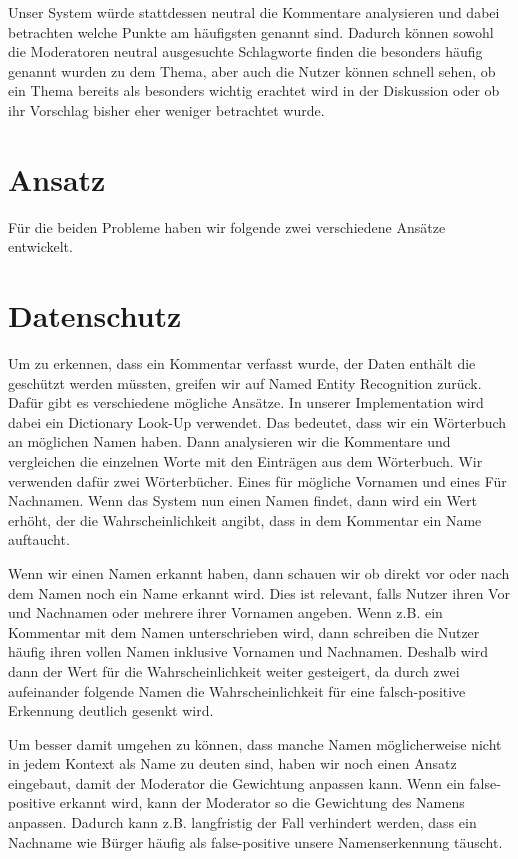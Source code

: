 \documentclass[runningheads]{llncs}
\begin{document}
Unser System würde stattdessen neutral die Kommentare analysieren und dabei betrachten welche Punkte am häufigsten genannt sind.
Dadurch können sowohl die Moderatoren neutral ausgesuchte Schlagworte finden die besonders häufig genannt wurden zu dem Thema, aber auch die Nutzer können schnell sehen, ob ein Thema bereits als besonders wichtig erachtet wird in der Diskussion oder ob ihr Vorschlag bisher eher weniger betrachtet wurde.

\section{Ansatz}
Für die beiden Probleme haben wir folgende zwei verschiedene Ansätze entwickelt.
\section{Datenschutz}
Um zu erkennen, dass ein Kommentar verfasst wurde, der Daten enthält die geschützt werden müssten, greifen wir auf Named Entity Recognition zurück.
Dafür gibt es verschiedene mögliche Ansätze.
In unserer Implementation wird dabei ein Dictionary Look-Up verwendet.
Das bedeutet, dass wir ein Wörterbuch an möglichen Namen haben.
Dann analysieren wir die Kommentare und vergleichen die einzelnen Worte mit den Einträgen aus dem Wörterbuch.
Wir verwenden dafür zwei Wörterbücher.
Eines für mögliche Vornamen und eines Für Nachnamen.
Wenn das System nun einen Namen findet, dann wird ein Wert erhöht, der die Wahrscheinlichkeit angibt, dass in dem Kommentar ein Name auftaucht.

Wenn wir einen Namen erkannt haben, dann schauen wir ob direkt vor oder nach dem Namen noch ein Name erkannt wird.
Dies ist relevant, falls Nutzer ihren Vor und Nachnamen oder mehrere ihrer Vornamen angeben. Wenn z.B. ein Kommentar mit dem Namen unterschrieben wird, dann schreiben die Nutzer häufig ihren vollen Namen inklusive Vornamen und Nachnamen.
Deshalb wird dann der Wert für die Wahrscheinlichkeit weiter gesteigert, da durch zwei aufeinander folgende Namen die Wahrscheinlichkeit für eine falsch-positive Erkennung deutlich gesenkt wird.

Um besser damit umgehen zu können, dass manche Namen möglicherweise nicht in jedem Kontext als Name zu deuten sind, haben wir noch einen Ansatz eingebaut, damit der Moderator die Gewichtung anpassen kann.
Wenn ein false-positive erkannt wird, kann der Moderator so die Gewichtung des Namens anpassen.
Dadurch kann z.B. langfristig der Fall verhindert werden, dass ein Nachname wie Bürger häufig als false-positive unsere Namenserkennung täuscht.
\end{document}
